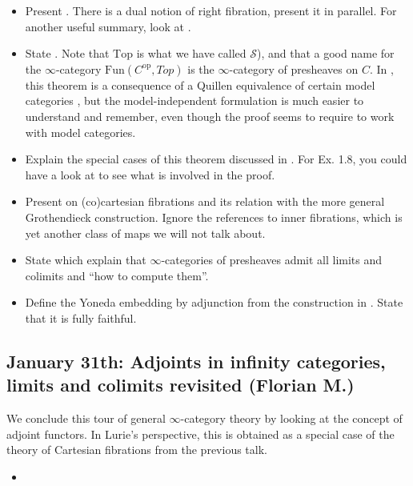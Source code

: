 \documentclass{amsart}
\theoremstyle{definition}
\theoremstyle{remark}
\newcommand{\op}{\mathrm{op}}
\begin{document}
\begin{itemize}
\item Present \cite[\S 2.1.1]{HTT}. There is a dual notion of right fibration, present it in parallel. For another useful summary, look at \cite[\S 1]{Barwick-Shah}.
\item State \cite[Thm 1.4]{Barwick-Shah}. Note that $\mathrm{Top}$ is what we have called $\mathcal{S}$), and that a good name for the $\infty$-category $\mathrm{Fun}(C^{\op},Top)$ is the $\infty$-category of presheaves on $C$. In \cite{HTT}, this theorem is a consequence of a Quillen equivalence of certain model categories \cite[Thm 2.2.1.2]{HTT}, but the model-independent formulation is much easier to understand and remember, even though the proof seems to require to work with model categories.
\item Explain the special cases of this theorem discussed in \cite[Ex. 1.5-1.9]{Barwick-Shah}. For Ex. 1.8, you could have a look at \cite[\S 1]{Barwick-Glasman} to see what is involved in the proof.
\item Present \cite[\S 3]{Barwick-Shah} on (co)cartesian fibrations and its relation with the more general Grothendieck construction. Ignore the references to inner fibrations, which is yet another class of maps we will not talk about.
\item State \cite[Cor. 5.1.2.3-4]{HTT} which explain that $\infty$-categories of presheaves admit all limits and colimits and \enquote{how to compute them}. 
\item Define the Yoneda embedding by adjunction from the construction in \cite[Ex. 1.8]{Barwick-Shah}. State that it is fully faithful. 
\end{itemize}

\subsection{January 31th: Adjoints in infinity categories, limits and colimits revisited (Florian M.)
}

We conclude this tour of general $\infty$-category theory by looking at the concept of adjoint functors. In Lurie's perspective, this is obtained as a special case of the theory of Cartesian fibrations from the previous talk. 

\begin{itemize}
\item 
\end{itemize}

\end{document}
